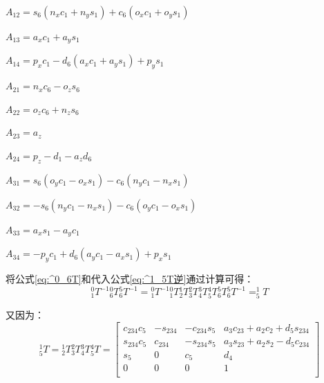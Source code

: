 \documentclass{seuthesis-2022}
\numberwithin{equation}{section}
\begin{document}
$A_{12} = s_6(n_xc_1+n_ys_1)+c_6(o_xc_1+o_ys_1)$

$A_{13} = a_xc_1+a_ys_1$

$A_{14} = p_xc_1-d_6(a_xc_1+a_ys_1)+p_ys_1$

$A_{21} = n_xc_6-o_zs_6$

$A_{22} = o_zc_6+n_zs_6$

$A_{23} = a_z$

$A_{24} = p_z-d_1-a_zd_6$

$A_{31} = s_6(o_yc_1-o_xs_1)-c_6(n_yc_1-n_xs_1)$

$A_{32} = -s_6(n_yc_1-n_xs_1)-c_6(o_yc_1-o_xs_1)$

$A_{33} = a_xs_1-a_yc_1$

$A_{34} = -p_yc_1+d_6(a_yc_1-a_xs_1)+p_xs_1$

将公式\eqref{eq:^0_6T}和代入公式\eqref{eq:^1_5T逆}通过计算可得：
\begin{equation}
  {^0_1T^{-1}} {^0_6T} {^5_6T^{-1}} = {^0_1T^{-1}} {^0_1T} {^1_2T} {^2_3T} {^3_4T} {^4_5T} {^5_6T}{^5_6T^{-1}} = ^1_5T
  \label{eq:^1_5T=^1_5T}
\end{equation}

又因为：
\begin{equation}
  ^1_5T = {^1_2T} {^2_3T} {^3_4T} {^4_5T} =
  \begin{bmatrix}
    c_{234}c_5 & -s_{234} & -c_{234}s_5 & a_3c_{23}+a_2c_2+d_5s_{234}\\
    s_{234}c_5 & c_{234} & -s_{234}s_5 & a_3s_{23}+a_2s_2-d_5c_{234}\\
    s_5 & 0 & c_5 & d_4\\
    0 & 0 & 0 & 1\\
  \end{bmatrix}
  \label{eq:^1_5T}
\end{equation}
\end{document}

